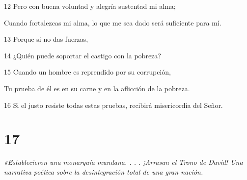 \par 12 Pero con buena voluntad y alegría sustentad mi alma;
\par     Cuando fortalezcas mi alma, lo que me sea dado será suficiente para mí.
\par 13 Porque si no das fuerzas,
\par 14 ¿Quién puede soportar el castigo con la pobreza?
\par 15 Cuando un hombre es reprendido por su corrupción,
\par     Tu prueba de él es en su carne y en la aflicción de la pobreza.
\par 16 Si el justo resiste todas estas pruebas, recibirá misericordia del Señor.

\chapter{17}

\par \textit{«Establecieron una monarquía mundana. . . . ¡Arrasan el Trono de David! Una narrativa poética sobre la desintegración total de una gran nación.}


